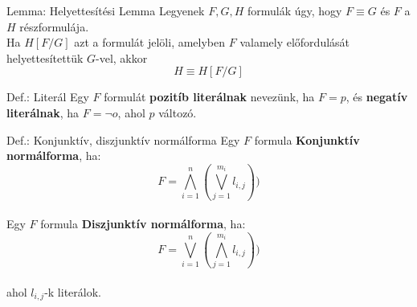 \documentclass{beamer}
\begin{document}
\begin{frame}

\begin{block}{Lemma: Helyettesítési Lemma}
Legyenek $F, G, H$ formulák úgy, hogy $F \equiv G$ és $F$ a $H$ részformulája.\\
Ha $H[F/G]$ azt a formulát jelöli, amelyben $F$ valamely előfordulását helyettesítettük $G$-vel, akkor
$$H \equiv H[F/G]$$
\end{block}

\end{frame}

\begin{frame}

\begin{block}{Def.: Literál}
Egy $F$ formulát \textbf{pozitíb literálnak} nevezünk, ha $F = p$, és \textbf{negatív literálnak}, ha $F = {\neg}o$, ahol $p$ változó.
\end{block}

\begin{block}{Def.: Konjunktív, diszjunktív normálforma}
Egy $F$ formula \textbf{Konjunktív normálforma}, ha:\\
$$F = \bigwedge_{i = 1}^n (\bigvee_{j = 1}^{m_i} l_{i, j}))$$\\
Egy $F$ formula \textbf{Diszjunktív normálforma}, ha:\\
$$F = \bigvee_{i = 1}^n (\bigwedge_{j = 1}^{m_i} l_{i, j}))$$\\
ahol $l_{i, j}$-k literálok.
\end{block}

\end{frame}
\end{document}
